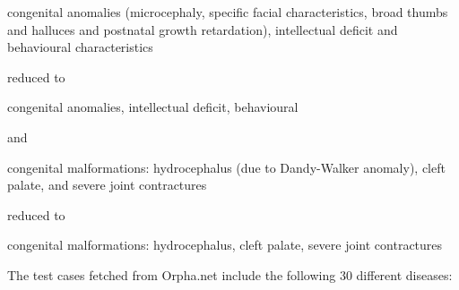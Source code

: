 congenital anomalies (microcephaly, specific facial characteristics, broad thumbs and halluces and postnatal growth retardation), intellectual deficit and behavioural characteristics

reduced to

congenital anomalies, intellectual deficit, behavioural

and 

congenital malformations: hydrocephalus (due to Dandy-Walker anomaly), cleft palate, and severe joint contractures

reduced to

congenital malformations: hydrocephalus, cleft palate, severe joint contractures

The test cases fetched from Orpha.net include the following 30 different diseases:

